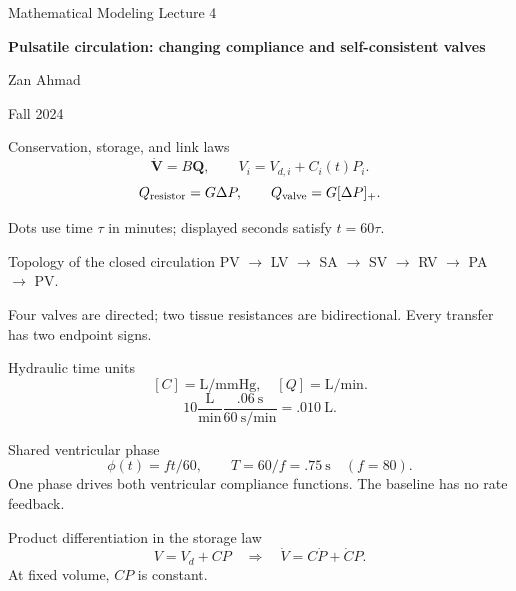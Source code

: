\documentclass[aspectratio=169,11pt]{beamer}
\newcommand{\notestarget}{notes.pdf}\newcommand{\noteslabel}{Notes}
\begin{document}
\begin{frame}[plain]\vfill
{\small\color{accent} Mathematical Modeling \quad Lecture 4}\par\medskip
{\raggedright{}\LARGE\bfseries\color{ink} Pulsatile circulation: changing compliance and self-consistent valves}\par\bigskip
Zan Ahmad\par\smallskip
{\small Fall 2024}\par\vfill\end{frame}
\renewcommand{\notestarget}{notes.pdf\#note-six-compartments-and-a-closed-volume-account}
\begin{frame}[t,fragile,label=slide-conservation-storage-and-link-laws]{Conservation, storage, and link laws}
\[\dot{\mathbf V}=B\mathbf Q,\qquad V_i=V_{d,i}+C_i(t)P_i.\]\pause{}\[Q_{\rm resistor}=G\Delta P,\qquad Q_{\rm valve}=G[\Delta P]_+.\]\par\medskip Dots use time $\tau$ in minutes; displayed seconds satisfy $t=60\tau$.
\end{frame}
\renewcommand{\notestarget}{notes.pdf\#note-six-compartments-and-a-closed-volume-account}
\begin{frame}[t,fragile,label=slide-topology-of-the-closed-circulation]{Topology of the closed circulation}
PV $\to$ LV $\to$ SA $\to$ SV $\to$ RV $\to$ PA $\to$ PV.\pause{}\par Four valves are directed; two tissue resistances are bidirectional. Every transfer has two endpoint signs.
\end{frame}
\renewcommand{\notestarget}{notes.pdf\#note-six-compartments-and-a-closed-volume-account}
\begin{frame}[t,fragile,label=slide-hydraulic-time-units]{Hydraulic time units}
\[[C]=\mathrm L/\mathrm{mmHg},\quad[Q]=\mathrm L/\mathrm{min}.\]\pause{}\[10\frac{\mathrm L}{\mathrm{min}}\frac{.06\ \mathrm s}{60\ \mathrm s/\mathrm{min}}=.010\ \mathrm L.\]
\end{frame}
\renewcommand{\notestarget}{notes.pdf\#note-pumping-by-a-time-dependent-storage-relation}
\begin{frame}[t,fragile,label=slide-shared-ventricular-phase]{Shared ventricular phase}
\[\phi(t)=ft/60,\qquad T=60/f=.75\ \mathrm s\quad(f=80).\]\pause{} One phase drives both ventricular compliance functions. The baseline has no rate feedback.
\end{frame}
\renewcommand{\notestarget}{notes.pdf\#note-pumping-by-a-time-dependent-storage-relation}
\begin{frame}[t,fragile,label=slide-product-differentiation-in-the-storage-law]{Product differentiation in the storage law}
\[V=V_d+CP\quad\Rightarrow\quad\dot V=C\dot P+\dot CP.\]\pause{} At fixed volume, $CP$ is constant.
\end{frame}
\end{document}
